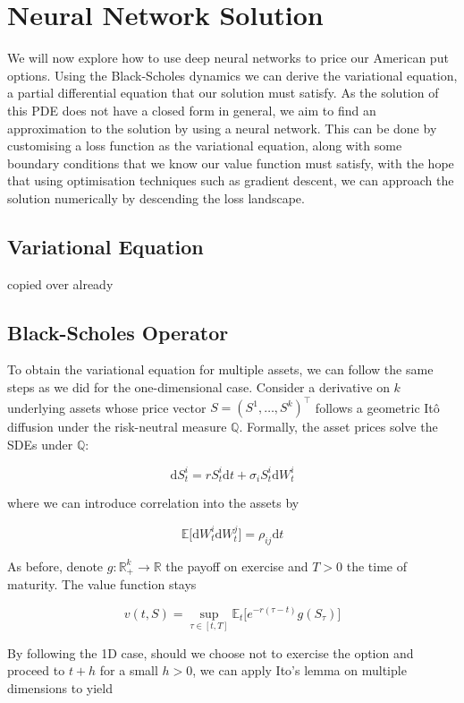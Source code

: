 \chapter{Neural Network Solution}

We will now explore how to use deep neural networks to price our American put options. Using the Black-Scholes dynamics we can derive the variational equation, a partial differential equation that our solution must satisfy. As the solution of this PDE does not have a closed form in general, we aim to find an approximation to the solution by using a neural network. This can be done by customising a loss function as the variational equation, along with some boundary conditions that we know our value function must satisfy, with the hope that using optimisation techniques such as gradient descent, we can approach the solution numerically by descending the loss landscape.

\section{Variational Equation}

copied over already

\section{Black-Scholes Operator}

To obtain the variational equation for multiple assets, we can follow the same steps as we did for the one-dimensional case. Consider a derivative on $k$ underlying assets whose price vector $S = (S^1 , \dots, S^k)^\top$ follows a geometric Itô diffusion under the risk-neutral measure $\mathbb Q$. Formally, the asset prices solve the SDEs under $\mathbb Q$:

\[
\mathrm dS_t^i = rS_t^i\mathrm dt + \sigma_i S^i_t \mathrm dW_t^i
\]

where we can introduce correlation into the assets by

\[
\mathbb E\big[\mathrm dW_t^i \mathrm dW_t^j\big] = \rho_{ij}\mathrm dt
\]

As before, denote $g:\mathbb R^k_+ \to \mathbb R$ the payoff on exercise and $T>0$ the time of maturity. The value function stays

\[
v(t, S) = \sup_{\tau \in [t, T]} \mathbb E_t\big[e^{-r(\tau - t)}g(S_\tau)\big]
\]

By following the 1D case, should we choose not to exercise the option and proceed to $t+h$ for a small $h > 0$, we can apply Ito’s lemma on multiple dimensions to yield

